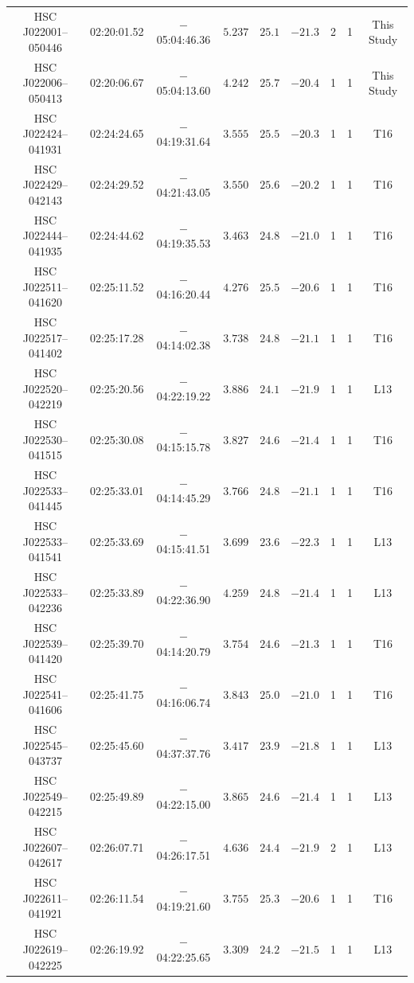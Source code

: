 \documentclass[]{pasj01}
\begin{document}
{\begin{longtable}{ccccccccc}
HSC J022001--050446 & 02:20:01.52 & $-$05:04:46.36 & $5.237$ & $25.1$ & $-21.3$ & 2 & 1 & This Study \\
HSC J022006--050413 & 02:20:06.67 & $-$05:04:13.60 & $4.242$ & $25.7$ & $-20.4$ & 1 & 1 & This Study \\
HSC J022424--041931 & 02:24:24.65 & $-$04:19:31.64 & $3.555$ & $25.5$ & $-20.3$ & 1 & 1 & T16 \\
HSC J022429--042143 & 02:24:29.52 & $-$04:21:43.05 & $3.550$ & $25.6$ & $-20.2$ & 1 & 1 & T16 \\
HSC J022444--041935 & 02:24:44.62 & $-$04:19:35.53 & $3.463$ & $24.8$ & $-21.0$ & 1 & 1 & T16 \\
HSC J022511--041620 & 02:25:11.52 & $-$04:16:20.44 & $4.276$ & $25.5$ & $-20.6$ & 1 & 1 & T16 \\
HSC J022517--041402 & 02:25:17.28 & $-$04:14:02.38 & $3.738$ & $24.8$ & $-21.1$ & 1 & 1 & T16 \\
HSC J022520--042219 & 02:25:20.56 & $-$04:22:19.22 & $3.886$ & $24.1$ & $-21.9$ & 1 & 1 & L13 \\
HSC J022530--041515 & 02:25:30.08 & $-$04:15:15.78 & $3.827$ & $24.6$ & $-21.4$ & 1 & 1 & T16 \\
HSC J022533--041445 & 02:25:33.01 & $-$04:14:45.29 & $3.766$ & $24.8$ & $-21.1$ & 1 & 1 & T16 \\
HSC J022533--041541 & 02:25:33.69 & $-$04:15:41.51 & $3.699$ & $23.6$ & $-22.3$ & 1 & 1 & L13 \\
HSC J022533--042236 & 02:25:33.89 & $-$04:22:36.90 & $4.259$ & $24.8$ & $-21.4$ & 1 & 1 & L13 \\
HSC J022539--041420 & 02:25:39.70 & $-$04:14:20.79 & $3.754$ & $24.6$ & $-21.3$ & 1 & 1 & T16 \\
HSC J022541--041606 & 02:25:41.75 & $-$04:16:06.74 & $3.843$ & $25.0$ & $-21.0$ & 1 & 1 & T16 \\
HSC J022545--043737 & 02:25:45.60 & $-$04:37:37.76 & $3.417$ & $23.9$ & $-21.8$ & 1 & 1 & L13 \\
HSC J022549--042215 & 02:25:49.89 & $-$04:22:15.00 & $3.865$ & $24.6$ & $-21.4$ & 1 & 1 & L13 \\
HSC J022607--042617 & 02:26:07.71 & $-$04:26:17.51 & $4.636$ & $24.4$ & $-21.9$ & 2 & 1 & L13 \\
HSC J022611--041921 & 02:26:11.54 & $-$04:19:21.60 & $3.755$ & $25.3$ & $-20.6$ & 1 & 1 & T16 \\
HSC J022619--042225 & 02:26:19.92 & $-$04:22:25.65 & $3.309$ & $24.2$ & $-21.5$ & 1 & 1 & L13 \\

\end{longtable}}
\end{document}

